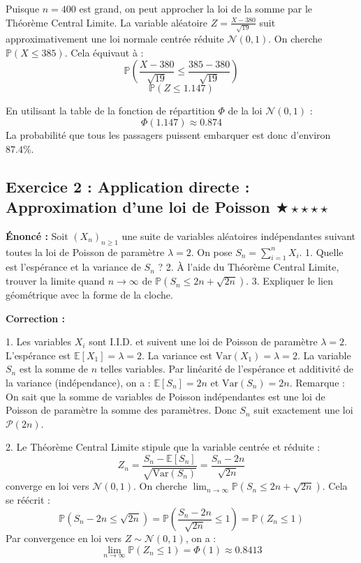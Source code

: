 \documentclass[11pt,a4paper]{article}
\begin{document}
Puisque $n=400$ est grand, on peut approcher la loi de la somme par le Théorème Central Limite.
La variable aléatoire $Z = \frac{X - 380}{\sqrt{19}}$ suit approximativement une loi normale centrée réduite $\mathcal{N}(0, 1)$.
On cherche $\mathbb{P}(X \le 385)$.
Cela équivaut à :
$$\mathbb{P}\left( \frac{X - 380}{\sqrt{19}} \le \frac{385 - 380}{\sqrt{19}} \right)$$
$$\mathbb{P}(Z \le 1.147)$$

En utilisant la table de la fonction de répartition $\Phi$ de la loi $\mathcal{N}(0, 1)$ :
$$\Phi(1.147) \approx 0.874$$
La probabilité que tous les passagers puissent embarquer est donc d'environ $87.4\%$.


\vspace{1cm}
\subsection*{Exercice 2 : Application directe : Approximation d'une loi de Poisson \quad $\bigstar\star\star\star\star$}

\textbf{Énoncé :}
Soit $(X_n)_{n \ge 1}$ une suite de variables aléatoires indépendantes suivant toutes la loi de Poisson de paramètre $\lambda = 2$.
On pose $S_n = \sum_{i=1}^n X_i$.
1. Quelle est l'espérance et la variance de $S_n$ ?
2. À l'aide du Théorème Central Limite, trouver la limite quand $n \to \infty$ de $\mathbb{P}(S_n \le 2n + \sqrt{2n})$.
3. Expliquer le lien géométrique avec la forme de la cloche.

\textbf{Correction :}

1. Les variables $X_i$ sont I.I.D. et suivent une loi de Poisson de paramètre $\lambda = 2$.
L'espérance est $\mathbb{E}[X_1] = \lambda = 2$.
La variance est $\text{Var}(X_1) = \lambda = 2$.
La variable $S_n$ est la somme de $n$ telles variables. Par linéarité de l'espérance et additivité de la variance (indépendance), on a :
$\mathbb{E}[S_n] = 2n$ et $\text{Var}(S_n) = 2n$.
Remarque : On sait que la somme de variables de Poisson indépendantes est une loi de Poisson de paramètre la somme des paramètres. Donc $S_n$ suit exactement une loi $\mathcal{P}(2n)$.

2. Le Théorème Central Limite stipule que la variable centrée et réduite :
$$Z_n = \frac{S_n - \mathbb{E}[S_n]}{\sqrt{\text{Var}(S_n)}} = \frac{S_n - 2n}{\sqrt{2n}}$$
converge en loi vers $\mathcal{N}(0, 1)$.
On cherche $\lim_{n \to \infty} \mathbb{P}(S_n \le 2n + \sqrt{2n})$.
Cela se réécrit :
$$\mathbb{P}\left( S_n - 2n \le \sqrt{2n} \right) = \mathbb{P}\left( \frac{S_n - 2n}{\sqrt{2n}} \le 1 \right) = \mathbb{P}(Z_n \le 1)$$
Par convergence en loi vers $Z \sim \mathcal{N}(0, 1)$, on a :
$$\lim_{n \to \infty} \mathbb{P}(Z_n \le 1) = \Phi(1) \approx 0.8413$$
\end{document}
